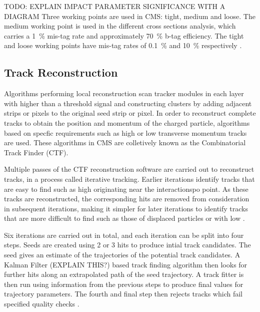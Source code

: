 TODO: EXPLAIN IMPACT PARAMETER SIGNIFICANCE WITH A DIAGRAM
Three working points are used in CMS: tight, medium and loose. The medium working point is used in the different
cross sections analysis, which carries a 1~\% mis-tag rate and approximately 70~\% b-tag efficiency. The tight
and loose working points have mis-tag rates of 0.1~\% and 10~\% respectively \cite{btagging}.

\subsection{Track Reconstruction}
\label{ss:track_reconstruction}
Algorithms performing local reconstruction scan tracker modules in each layer with higher than a threshold
signal and constructing clusters by adding adjacent strips or pixels to the original seed strip or pixel. In
order to reconstruct complete tracks to obtain the position and momentum of the charged particle, algorithms
based on specfic requirements such as high or low transverse momentum tracks are used. These algorithms in CMS
are colletively known as the Combinatorial Track Finder (CTF).

Multiple passes of the CTF reconstruction software are carried out to reconstruct tracks, in a process called
iterative tracking. Earlier iterations identify tracks that are easy to find such as high \pt originating
near the interactionspo point. As these tracks are reconstructed, the corresponding hits are removed from
consideration in subsequent iterations, making it simpler for later iterations to identify tracks that are
more difficult to find such as those of displaced particles or with low \pt.

Six iterations are carried out in total, and each iteration can be split into four steps. Seeds are created
using 2 or 3 hits to produce intial track candidates. The seed gives an estimate of the trajectories of the
potential track candidates. A Kalman Filter (EXPLAIN THIS?) \cite{kalman_filter} based track finding algorithm
then looks for further hits along an extrapolated path of the seed trajectory. A track fitter is then run
using information from the previous steps to produce final values for trajectory parameters. The fourth and
final step then rejects tracks which fail specified quality checks \cite{track_reconstruction}.


